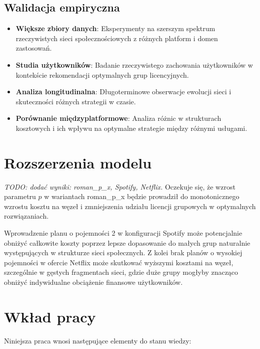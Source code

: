 \subsection{Walidacja empiryczna}

\begin{itemize}
  \item \textbf{Większe zbiory danych}: Eksperymenty na szerszym spektrum rzeczywistych sieci społecznościowych z różnych platform i domen zastosowań.

  \item \textbf{Studia użytkowników}: Badanie rzeczywistego zachowania użytkowników w kontekście rekomendacji optymalnych grup licencyjnych.

  \item \textbf{Analiza longitudinalna}: Długoterminowe obserwacje ewolucji sieci i skuteczności różnych strategii w czasie.

  \item \textbf{Porównanie międzyplatformowe}: Analiza różnic w strukturach kosztowych i ich wpływu na optymalne strategie między różnymi usługami.
\end{itemize}

\section{Rozszerzenia modelu}

\emph{TODO: dodać wyniki: roman\_p\_x, Spotify, Netflix.} Oczekuje się, że wzrost parametru $p$ w wariantach roman\_p\_x będzie prowadził do monotonicznego wzrostu kosztu na węzeł i zmniejszenia udziału licencji grupowych w optymalnych rozwiązaniach.

Wprowadzenie planu o pojemności 2 w konfiguracji Spotify może potencjalnie obniżyć całkowite koszty poprzez lepsze dopasowanie do małych grup naturalnie występujących w strukturze sieci społecznych. Z kolei brak planów o wysokiej pojemności w ofercie Netflix może skutkować wyższymi kosztami na węzeł, szczególnie w gęstych fragmentach sieci, gdzie duże grupy mogłyby znacząco obniżyć indywidualne obciążenie finansowe użytkowników.

\section{Wkład pracy}

Niniejsza praca wnosi następujące elementy do stanu wiedzy:

